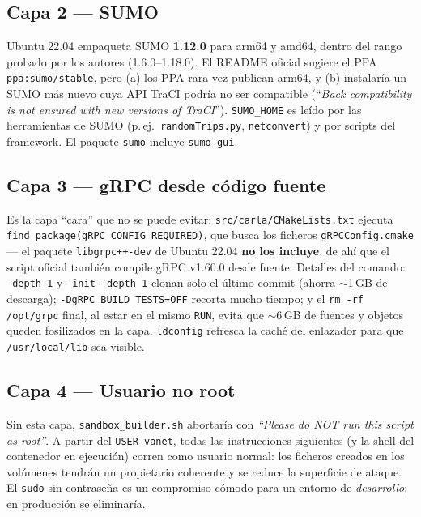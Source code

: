 \documentclass[11pt,a4paper]{article}
\begin{document}
\subsection{Capa 2 --- SUMO}

\begin{implicacion}
Ubuntu 22.04 empaqueta SUMO \textbf{1.12.0} para arm64 y amd64, dentro del
rango probado por los autores (1.6.0--1.18.0). El README oficial sugiere el
PPA \texttt{ppa:sumo/stable}, pero (a) los PPA rara vez publican arm64, y
(b) instalar\'ia un SUMO m\'as nuevo cuya API TraCI podr\'ia no ser
compatible (``\emph{Back compatibility is not ensured with new versions of
TraCI}''). \texttt{SUMO\_HOME} es le\'ido por las herramientas de SUMO
(p.\,ej.\ \texttt{randomTrips.py}, \texttt{netconvert}) y por scripts del
framework. El paquete \texttt{sumo} incluye \texttt{sumo-gui}.
\end{implicacion}

\subsection{Capa 3 --- gRPC desde c\'odigo fuente}

\begin{implicacion}
Es la capa ``cara'' que no se puede evitar: \texttt{src/carla/CMakeLists.txt}
ejecuta \texttt{find\_package(gRPC CONFIG REQUIRED)}, que busca los ficheros
\texttt{gRPCConfig.cmake} --- el paquete \texttt{libgrpc++-dev} de Ubuntu
22.04 \textbf{no los incluye}, de ah\'i que el script oficial tambi\'en
compile gRPC v1.60.0 desde fuente. Detalles del comando:
\texttt{--depth 1} y \texttt{--init --depth 1} clonan solo el \'ultimo commit
(ahorra $\sim$1\,GB de descarga); \texttt{-DgRPC\_BUILD\_TESTS=OFF} recorta
mucho tiempo; y el \texttt{rm -rf /opt/grpc} final, al estar en el mismo
\texttt{RUN}, evita que $\sim$6\,GB de fuentes y objetos queden fosilizados
en la capa. \texttt{ldconfig} refresca la cach\'e del enlazador para que
\texttt{/usr/local/lib} sea visible.
\end{implicacion}

\subsection{Capa 4 --- Usuario no root}

\begin{implicacion}
Sin esta capa, \texttt{sandbox\_builder.sh} abortar\'ia con \emph{``Please do
NOT run this script as root''}. A partir del \texttt{USER vanet}, todas las
instrucciones siguientes (y la shell del contenedor en ejecuci\'on) corren
como usuario normal: los ficheros creados en los vol\'umenes tendr\'an un
propietario coherente y se reduce la superficie de ataque. El \texttt{sudo}
sin contrase\~na es un compromiso c\'omodo para un entorno de
\emph{desarrollo}; en producci\'on se eliminar\'ia.
\end{implicacion}
\end{document}
